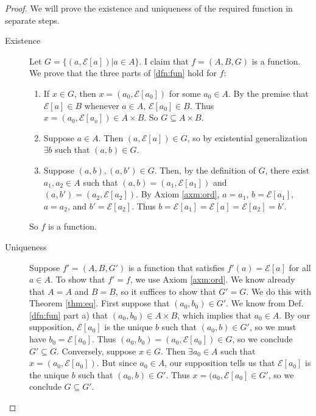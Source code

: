 \documentclass[12pt]{article}
\begin{document}
\begin{proof} We will prove the existence and uniqueness of the required function in separate steps.
  \begin{description}
    \item[Existence] Let $G=\{(a,\mathcal{E}[a])|a\in A\}$.  I claim
      that $f=(A,B,G)$ is a function.  We prove that the three parts
      of \ref{dfn:fun} hold for $f$:
      \begin{enumerate}[label=\alph*)]
        \item If $x\in G$, then $x=(a_0,\mathcal{E}[a_0])$ for some
          $a_0\in A$.  By the premise that $\mathcal{E}[a]\in B$
          whenever $a\in A$, $\mathcal{E}[a_0]\in B$.  Thus
          $x=(a_0,\mathcal{E}[a_o])\in A\times B$.  So $G\subseteq A\times B$.
        \item Suppose $a\in A$.  Then $(a,\mathcal{E}[a])\in G$,
          so by existential generalization $\exists b$ such that
          $(a,b)\in G$.
        \item Suppose $(a,b),(a,b')\in G$.  Then, by the definition of
          $G$, there exist $a_1, a_2\in A$ such that
          $(a,b)=(a_1,\mathcal{E}[a_1])$ and
          $(a,b')=(a_2,\mathcal{E}[a_2])$.  By Axiom \ref{axm:ord},
          $a=a_1$, $b=\mathcal{E}[a_1]$, $a=a_2$, and
          $b'=\mathcal{E}[a_2]$.  Thus
          $b=\mathcal{E}[a_1]=\mathcal{E}[a]=\mathcal{E}[a_2]=b'$.
      \end{enumerate}
      So $f$ is a function.
    \item[Uniqueness] Suppose $f'=(A,B,G')$ is a function that
      satisfies $f'(a)=\mathcal{E}[a]$ for all $a\in A$.  To show that
      $f'=f$, we use Axiom \ref{axm:ord}.  We know already that $A=A$
      and $B=B$, so it suffices to show that $G'=G$.  We do this with
      Theorem \ref{thm:eq}.  First suppose that $(a_0,b_0)\in G'$.  We
      know from Def. \ref{dfn:fun} part a) that $(a_0,b_0)\in A\times
      B$, which implies that $a_0\in A$.  By our supposition,
      $\mathcal{E}[a_0]$ is the unique $b$ such that $(a_0,b)\in G'$,
      so we must have $b_0=\mathcal{E}[a_0]$.  Thus
      $(a_0,b_0)=(a_0,\mathcal{E}[a_0])\in G$, so we conclude
      $G'\subseteq G$.  Conversely, suppose $x\in G$.  Then $\exists
      a_0\in A$ such that $x=(a_0,\mathcal{E}[a_0])$.  But since $a_0
      \in A$, our supposition tells us that $\mathcal{E}[a_0]$ is the
      unique $b$ such that $(a_0,b)\in G'$.  Thus
      $x=(a_0,\mathcal{E}[a_0]\in G'$, so we conclude $G\subseteq G'$.
  \end{description}
\end{proof}
\end{document}
